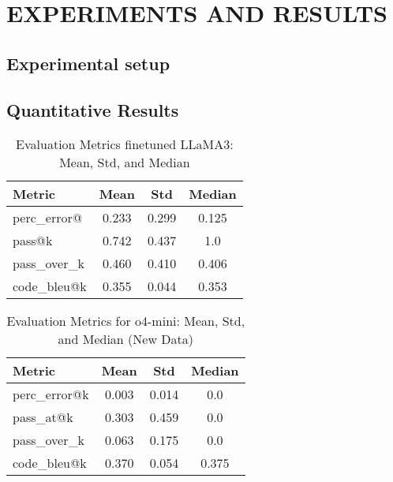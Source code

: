\chapter{ EXPERIMENTS AND RESULTS}


\section{Experimental setup}

\section{Quantitative Results}

\begin{table}[h!]
\centering
\caption{Evaluation Metrics finetuned LLaMA3: Mean, Std, and Median}
{%
\begin{tabular}{l|ccc}
\toprule
\textbf{Metric} & \textbf{Mean} & \textbf{Std} & \textbf{Median} \\
\midrule
perc\_error@ & 0.233 & 0.299 & 0.125 \\
pass@k    & 0.742 & 0.437 & 1.0   \\
pass\_over\_k  & 0.460 & 0.410 & 0.406 \\
code\_bleu@k  & 0.355 & 0.044 & 0.353 \\
\bottomrule
\end{tabular}
}
\label{tab:metrics_generated}
\end{table}

\begin{table}[h!]
\centering
\caption{Evaluation Metrics for o4-mini: Mean, Std, and Median (New Data)}
{%
\begin{tabular}{l|ccc}
\toprule
\textbf{Metric} & \textbf{Mean} & \textbf{Std} & \textbf{Median} \\
\midrule
perc\_error@k     & 0.003 & 0.014 & 0.0   \\
pass\_at@k        & 0.303 & 0.459 & 0.0   \\
pass\_over\_k      & 0.063 & 0.175 & 0.0   \\
code\_bleu@k      & 0.370 & 0.054 & 0.375 \\
\bottomrule
\end{tabular}
}
\label{tab:metrics_new_data}
\end{table}



